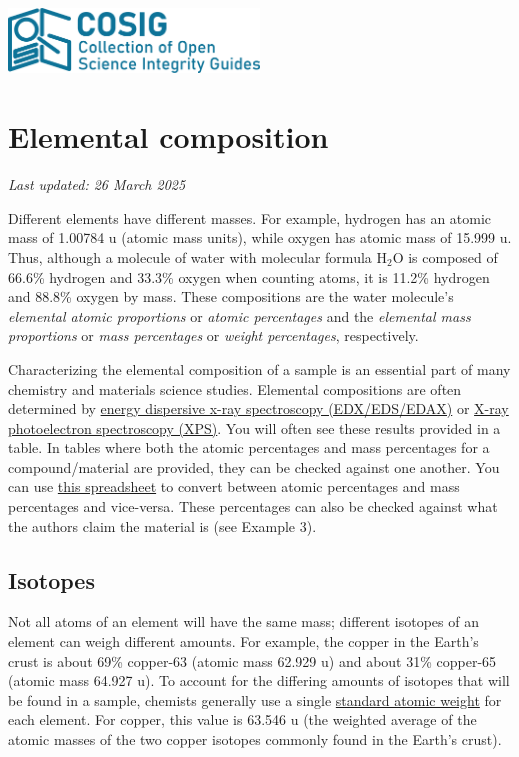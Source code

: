 \documentclass[letterpaper, 12pt]{article}
\begin{document}
\flushleft
\includegraphics[width=0.5\textwidth]{img/home/241017_final_logo_mockup.png}

\section*{Elemental composition}
\textit{Last updated: 26 March 2025}

Different elements have different masses. For example, hydrogen has an atomic mass of 1.00784 u (atomic mass units), while oxygen has atomic mass of 15.999 u. Thus, although a molecule of water with molecular formula H$_2$O is composed of 66.6\% hydrogen and 33.3\% oxygen when counting atoms, it is 11.2\% hydrogen and 88.8\% oxygen by mass. These compositions are the water molecule's \textit{elemental atomic proportions} or \textit{atomic percentages} and the \textit{elemental mass proportions} or \textit{mass percentages} or \textit{weight percentages}, respectively.

Characterizing the elemental composition of a sample is an essential part of many chemistry and materials science studies. Elemental compositions are often determined by \href{https://en.wikipedia.org/wiki/Energy-dispersive_X-ray_spectroscopy}{energy dispersive x-ray spectroscopy (EDX/EDS/EDAX)} or \href{https://en.wikipedia.org/wiki/X-ray_photoelectron_spectroscopy}{X-ray photoelectron spectroscopy (XPS)}. You will often see these results provided in a table. In tables where both the atomic percentages and mass percentages for a compound/material are provided, they can be checked against one another. You can use \href{https://osf.io/gp4mf}{this spreadsheet} to convert between atomic percentages and mass percentages and vice-versa. These percentages can also be checked against what the authors claim the material is (see Example 3).

\subsection*{Isotopes}

Not all atoms of an element will have the same mass; different isotopes of an element can weigh different amounts. For example, the copper in the Earth's crust is about 69\% copper-63 (atomic mass 62.929 u) and about 31\% copper-65 (atomic mass 64.927 u). To account for the differing amounts of isotopes that will be found in a sample, chemists generally use a single \href{https://en.wikipedia.org/wiki/Standard_atomic_weight}{standard atomic weight} for each element. For copper, this value is 63.546 u (the weighted average of the atomic masses of the two copper isotopes commonly found in the Earth's crust).
\end{document}
